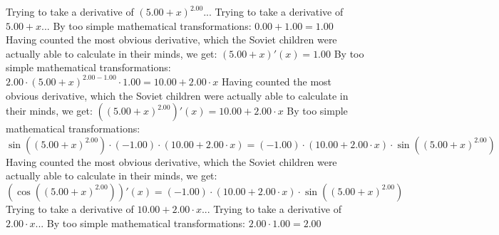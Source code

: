 \documentclass{article}
\begin{document}
\newline
Trying to take a derivative of ${\left({{5.00} + {x}}\right) ^ {2.00}}$...\newline
\newline
Trying to take a derivative of ${{5.00} + {x}}$...\newline
\newline
By too simple mathematical transformations:
 ${{0.00} + {1.00}} = {1.00}$ 
 \newline
 \newline 
Having counted the most obvious derivative, which the Soviet children were actually able to calculate in their minds, we get:
$({{5.00} + {x}})'(x) = {1.00}$\newline
\newline
By too simple mathematical transformations:
 ${{{2.00} \cdot {\left({{5.00} + {x}}\right) ^ {{2.00} - {1.00}}}} \cdot {1.00}} = {{10.00} + {{2.00} \cdot {x}}}$ 
 \newline
 \newline 
Having counted the most obvious derivative, which the Soviet children were actually able to calculate in their minds, we get:
$({\left({{5.00} + {x}}\right) ^ {2.00}})'(x) = {{10.00} + {{2.00} \cdot {x}}}$\newline
\newline
By too simple mathematical transformations:
 ${{ \sin {\left({\left({{5.00} + {x}}\right) ^ {2.00}}\right)}  \cdot \left({-1.00}\right)} \cdot \left({{10.00} + {{2.00} \cdot {x}}}\right)} = {\left({-1.00}\right) \cdot {\left({{10.00} + {{2.00} \cdot {x}}}\right) \cdot  \sin {\left({\left({{5.00} + {x}}\right) ^ {2.00}}\right)} }}$ 
 \newline
 \newline 
Having counted the most obvious derivative, which the Soviet children were actually able to calculate in their minds, we get:
$( \cos {\left({\left({{5.00} + {x}}\right) ^ {2.00}}\right)} )'(x) = {\left({-1.00}\right) \cdot {\left({{10.00} + {{2.00} \cdot {x}}}\right) \cdot  \sin {\left({\left({{5.00} + {x}}\right) ^ {2.00}}\right)} }}$\newline
\newline
Trying to take a derivative of ${{10.00} + {{2.00} \cdot {x}}}$...\newline
\newline
Trying to take a derivative of ${{2.00} \cdot {x}}$...\newline
\newline
By too simple mathematical transformations:
 ${{2.00} \cdot {1.00}} = {2.00}$ 
\end{document}

